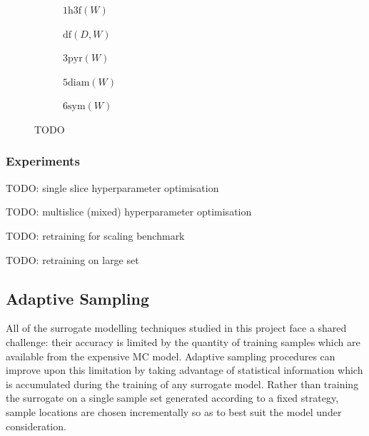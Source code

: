 \begin{figure}[h]
	\centering
	\begin{subfigure}[b]{0.20\textwidth}
		\centering
		{\footnotesize {}}
		\caption{$\text{1h3f}(W)$}
	\end{subfigure}\hfill%
	\begin{subfigure}[b]{0.15\textwidth}
		\centering
		{\footnotesize {}}
		\caption{$\text{df}(D,W)$}
	\end{subfigure}\hfill%
	\begin{subfigure}[b]{0.15\textwidth}
		\centering
		{\footnotesize {}}
		\caption{$\text{3pyr}(W)$}
	\end{subfigure}\hfill%
	\begin{subfigure}[b]{0.20\textwidth}
		\centering
		{\footnotesize {}}
		\caption{$\text{5diam}(W)$}
	\end{subfigure}\hfill%
	\begin{subfigure}[b]{0.20\textwidth}
		\centering
		{\footnotesize {}} %
		\caption{$\text{6sym}(W)$}
	\end{subfigure}

	\caption{TODO}
	\label{fig:neural-net-architectures}
\end{figure}

\subsubsection{Experiments}

TODO: single slice hyperparameter optimisation

TODO: multislice (mixed) hyperparameter optimisation

TODO: retraining for scaling benchmark

TODO: retraining on large set


\newpage

\subsection{Adaptive Sampling}
\label{sec:adaptive}

All of the surrogate modelling techniques studied in this project face a shared challenge: their accuracy is limited by the quantity of training samples which are available from the expensive MC model. Adaptive sampling procedures can improve upon this limitation by taking advantage of statistical information which is accumulated during the training of any surrogate model. Rather than training the surrogate on a single sample set generated according to a fixed strategy, sample locations are chosen incrementally so as to best suit the model under consideration.

